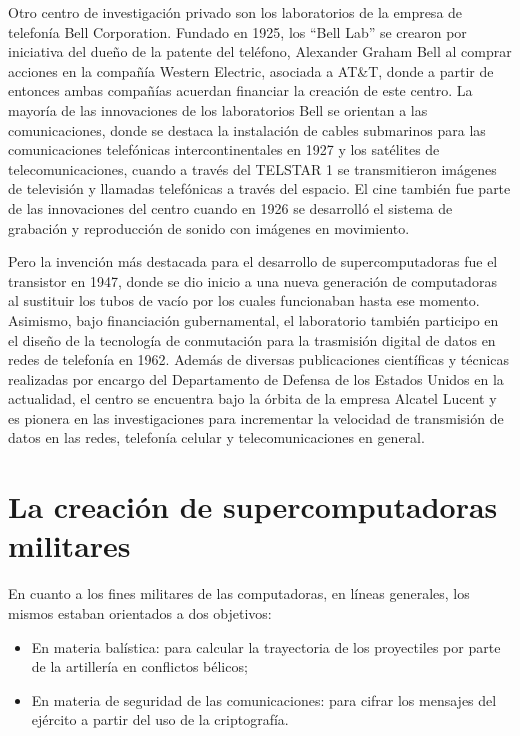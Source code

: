\documentclass[
  letterpaper,
  DIV=11,
  numbers=noendperiod]{scrreprt}
\begin{document}
Otro centro de investigación privado son los laboratorios de la empresa
de telefonía Bell Corporation. Fundado en 1925, los ``Bell Lab'' se
crearon por iniciativa del dueño de la patente del teléfono, Alexander
Graham Bell al comprar acciones en la compañía Western Electric,
asociada a AT\&T, donde a partir de entonces ambas compañías acuerdan
financiar la creación de este centro. La mayoría de las innovaciones de
los laboratorios Bell se orientan a las comunicaciones, donde se destaca
la instalación de cables submarinos para las comunicaciones telefónicas
intercontinentales en 1927 y los satélites de telecomunicaciones, cuando
a través del TELSTAR 1 se transmitieron imágenes de televisión y
llamadas telefónicas a través del espacio. El cine también fue parte de
las innovaciones del centro cuando en 1926 se desarrolló el sistema de
grabación y reproducción de sonido con imágenes en movimiento.

Pero la invención más destacada para el desarrollo de supercomputadoras
fue el transistor en 1947, donde se dio inicio a una nueva generación de
computadoras al sustituir los tubos de vacío por los cuales funcionaban
hasta ese momento. Asimismo, bajo financiación gubernamental, el
laboratorio también participo en el diseño de la tecnología de
conmutación para la trasmisión digital de datos en redes de telefonía en
1962. Además de diversas publicaciones científicas y técnicas realizadas
por encargo del Departamento de Defensa de los Estados Unidos en la
actualidad, el centro se encuentra bajo la órbita de la empresa Alcatel
Lucent y es pionera en las investigaciones para incrementar la velocidad
de transmisión de datos en las redes, telefonía celular y
telecomunicaciones en general.

\section{\texorpdfstring{\textbf{La creación de supercomputadoras
militares}}{La creación de supercomputadoras militares}}\label{la-creaciuxf3n-de-supercomputadoras-militares}

En cuanto a los fines militares de las computadoras, en líneas
generales, los mismos estaban orientados a dos objetivos:

\begin{itemize}
\item
  En materia balística: para calcular la trayectoria de los proyectiles
  por parte de la artillería en conflictos bélicos;
\item
  En materia de seguridad de las comunicaciones: para cifrar los
  mensajes del ejército a partir del uso de la criptografía.
\end{itemize}
\end{document}
